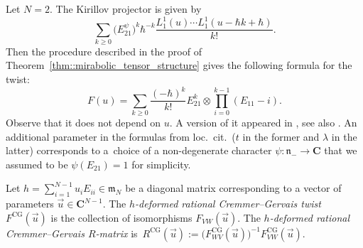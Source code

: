 \documentclass[pdftex]{sigma}
\numberwithin{equation}{section}
\newcommand{\CG}{\mathrm{CG}}
\newcommand{\C}{\mathbf{C}}
\newcommand{\n}{\mathfrak{n}}
\newcommand{\m}{\mathfrak{m}}
\begin{document}
	\begin{Example}
		Let $N=2$. The Kirillov projector is given by
		\[
		\sum\limits_{k\geq 0} \bigl(E_{21}^{\psi}\bigr)^k \hbar^{-k} \frac{L_1^1(u) \cdots L_1^1(u-\hbar k + \hbar)}{k!}.
		\]
		Then the procedure described in the proof of Theorem~\ref{thm::mirabolic_tensor_structure} gives the following formula for the twist:
		\begin{equation}
			\label{eq::cg_twist_gl2}
			F(u)= \sum\limits_{k\geq 0} \frac{(-\hbar)^k}{k!} E_{21}^k \otimes \prod_{i=0}^{k-1} (E_{11} - i).
		\end{equation}
		Observe that it does not depend on $u$. A version of it appeared in \cite{GerstenhaberGiaquintoSchack}, see also \cite{KhoroshkinStolinTolstoy}. An additional parameter in the formulas from loc.\ cit.\  ($t$ in the former and $\lambda$ in the latter) corresponds to a~choice of a non-degenerate character $\psi\colon \n_- \rightarrow \C$ that we assumed to be $\psi(E_{21})=1$ for simplicity.
	\end{Example}
	
	\begin{Definition}
		\label{def::cremmer_gervais}
		Let $h = \sum_{i=1}^{N-1} u_i E_{ii} \in \m_N$ be a diagonal matrix corresponding to a vector of parameters $\vec{u} \in \C^{N-1}$. The $h$\emph{-deformed rational Cremmer--Gervais twist} $F^{\CG}(\vec{u})$ is the collection of isomorphisms $F_{VW}(\vec{u})$. The $h$\emph{-deformed rational Cremmer--Gervais $R$-matrix} is~$R^{\CG}(\vec{u}):= \bigl(F_{WV}^{\CG}(\vec{u})\bigr)^{-1} F_{VW}^{\CG}(\vec{u})$.
	\end{Definition}
	
\end{document}

